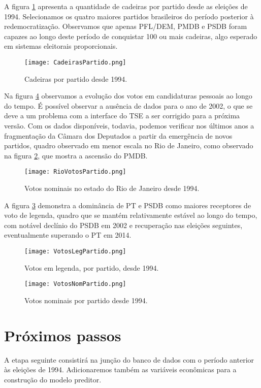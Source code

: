 \documentclass[
	article,			%
	11pt,				%
	oneside,			%
	a4paper,			%
	english,			%
	brazil,				%
	sumario=tradicional
	]{abntex2}
\begin{document}
A figura \ref{fig:cadeiras-partido}  apresenta a quantidade de cadeiras por partido desde as eleições de 1994. Selecionamos os quatro maiores partidos brasileiros do período posterior à redemocratização. Observamos que apenas PFL/DEM, PMDB e PSDB foram capazes ao longo deste período de conquistar 100 ou mais cadeiras, algo esperado em sistemas eleitorais proporcionais.

\begin{figure}
	\centering
	\texttt{[image: CadeirasPartido.png]}
	\caption{Cadeiras por partido desde 1994.}
	\label{fig:cadeiras-partido}
\end{figure}

Na figura \ref{fig:votos-nominais-partido} observamos a evolução dos votos em candidaturas pessoais ao longo do tempo. É possível observar a ausência de dados para o ano de 2002, o que se deve a um problema com a interface do TSE a ser corrigido para a próxima versão. Com os dados disponíveis, todavia, podemos verificar nos últimos anos a fragmentação da Câmara dos Deputados a partir da emergência de novos partidos, quadro observado em menor escala no Rio de Janeiro, como observado na figura \ref{fig:votos-partido-rio}, que mostra a ascensão do PMDB. 

\begin{figure}
	\centering
	\texttt{[image: RioVotosPartido.png]}
	\caption{Votos nominais no estado do Rio de Janeiro desde 1994.}
	\label{fig:votos-partido-rio}
\end{figure}

A figura \ref{fig:votos-leg} demonstra a dominância de PT e PSDB como maiores receptores de voto de legenda, quadro que se mantém relativamente estável ao longo do tempo, com notável declínio do PSDB em 2002 e recuperação nas eleições seguintes, eventualmente superando o PT em 2014.

\begin{figure}
	\centering
	\texttt{[image: VotosLegPartido.png]}
	\caption{Votos em legenda, por partido, desde 1994.}
	\label{fig:votos-leg}
\end{figure}

\begin{figure}
	\centering
	\texttt{[image: VotosNomPartido.png]}
	\caption{Votos nominais por partido desde 1994.}
	\label{fig:votos-nominais-partido}
\end{figure}

\section*{Próximos passos}

A etapa seguinte consistirá na junção do banco de dados com o período anterior às eleições de 1994. Adicionaremos também as variáveis econômicas para a construção do modelo preditor.


\end{document}
